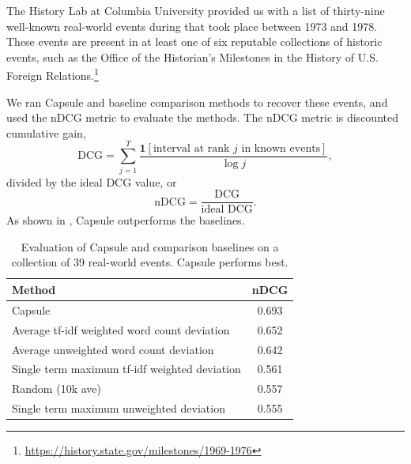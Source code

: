 The History Lab at Columbia University provided us with a list of
thirty-nine well-known real-world events during that took place between 1973 and
1978. These events are present in at least one of six reputable
collections of historic events, such as the Office of the Historian's
Milestones in the History of U.S. Foreign
Relations.\footnote{\url{https://history.state.gov/milestones/1969-1976}}

We ran Capsule and baseline comparison methods to recover these events, and used the nDCG metric to evaluate the methods.  The nDCG metric is discounted cumulative gain,
\begin{equation}
\mbox{DCG} = \sum_{j=1}^T \frac{\mathbf{1}[\mbox{interval at rank $j$ in known events}]}{\log j},
\end{equation}
divided by the ideal DCG value, or
\begin{equation}
\mbox{nDCG} = \frac{\mbox{DCG}}{\mbox{ideal DCG}}.
\end{equation}
As shown in , Capsule outperforms the baselines.
\begin{table}[bt]
\centering
\begin{tabular}{l c}
\toprule
\textbf{Method} & \textbf{nDCG} \\
\midrule
Capsule & 0.693 \\
Average tf-idf weighted word count deviation & 0.652 \\
Average unweighted word count deviation & 0.642 \\
Single term maximum tf-idf weighted deviation & 0.561 \\
Random (10k ave) & 0.557 \\
Single term maximum unweighted deviation & 0.555 \\
\bottomrule
\end{tabular}
\caption{Evaluation of Capsule and comparison baselines on a collection of 39 real-world events.  Capsule performs best.}
\label{table:cables:ndcg}
\end{table}

